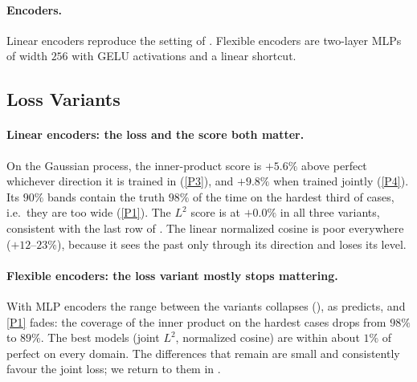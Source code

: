 \documentclass[11pt]{article}
\theoremstyle{plain}
\theoremstyle{definition}
\theoremstyle{remark}
\begin{document}
\paragraph{Encoders.}
Linear encoders reproduce the setting of \cite{baptista2025mathematical}.
Flexible encoders are two-layer MLPs of width $256$ with GELU activations and
a linear shortcut.

\subsection{Loss Variants}
\label{ssec:lossvariants}

\paragraph{Linear encoders: the loss and the score both matter.}
On the Gaussian process, the inner-product score is $+5.6\%$ above perfect
whichever direction it is trained in (\ref{P3}), and $+9.8\%$ when trained
jointly (\ref{P4}). Its $90\%$ bands contain the truth $98\%$ of the time on
the hardest third of cases, i.e.\ they are too wide (\ref{P1}). The $L^2$
score is at $+0.0\%$ in all three variants, consistent with the last row of
. The linear normalized cosine is poor everywhere
($+12$--$23\%$), because it sees the past only through its direction and
loses its level.

\paragraph{Flexible encoders: the loss variant mostly stops mattering.}
With MLP encoders the range between the variants collapses
(), as  predicts, and \ref{P1}
fades: the coverage of the inner product on the hardest cases drops from
$98\%$ to $89\%$. The best models (joint $L^2$, normalized cosine) are within
about $1\%$ of perfect on every domain. The differences that remain are
small and consistently favour the joint loss; we return to them in
.
\end{document}
